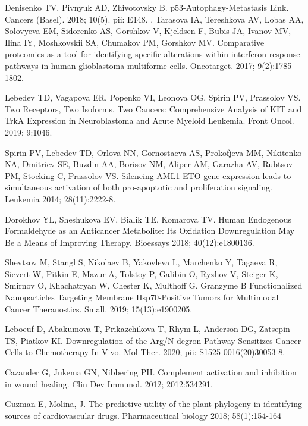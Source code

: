 \documentclass[12pt,aps]{revtex4}
\begin{document}
\begin{thebibliography}{00}


 Denisenko TV, Pivnyuk AD, Zhivotovsky B. p53-Autophagy-Metastasis Link. Cancers (Basel). 2018; 10(5). pii: E148. 
.
 Tarasova IA, Tereshkova AV, Lobas AA, Solovyeva EM, Sidorenko AS, Gorshkov V, Kjeldsen F, Bubis JA, Ivanov MV, Ilina IY, Moshkovskii SA, Chumakov PM, Gorshkov MV. Comparative proteomics as a tool for identifying specific alterations within interferon response pathways in human glioblastoma multiforme cells. Oncotarget. 2017; 9(2):1785-1802. 

 Lebedev TD, Vagapova ER, Popenko VI, Leonova OG, Spirin PV, Prassolov VS. Two Receptors, Two Isoforms, Two Cancers: Comprehensive Analysis of KIT and TrkA Expression in Neuroblastoma and Acute Myeloid Leukemia. Front Oncol. 2019; 9:1046. 

 Spirin PV, Lebedev TD, Orlova NN, Gornostaeva AS, Prokofjeva MM, Nikitenko NA, Dmitriev SE, Buzdin AA, Borisov NM, Aliper AM, Garazha AV, Rubtsov PM, Stocking C, Prassolov VS. Silencing AML1-ETO gene expression leads to simultaneous activation of both pro-apoptotic and proliferation signaling. Leukemia 2014; 28(11):2222-8. 

 Dorokhov YL, Sheshukova EV, Bialik TE, Komarova TV. Human Endogenous Formaldehyde as an Anticancer Metabolite: Its Oxidation Downregulation May Be a Means of Improving Therapy. Bioessays 2018; 40(12):e1800136.

 Shevtsov M, Stangl S, Nikolaev B, Yakovleva L, Marchenko Y, Tagaeva R, Sievert W, Pitkin E, Mazur A, Tolstoy P, Galibin O, Ryzhov V, Steiger K, Smirnov O, Khachatryan W, Chester K, Multhoff G. Granzyme B Functionalized Nanoparticles Targeting Membrane Hsp70-Positive Tumors for Multimodal Cancer Theranostics. Small. 2019; 15(13):e1900205.

 Leboeuf D, Abakumova T, Prikazchikova T, Rhym L, Anderson DG, Zatsepin TS, Piatkov KI. Downregulation of the Arg/N-degron Pathway Sensitizes Cancer Cells to Chemotherapy In Vivo. Mol Ther. 2020; pii: S1525-0016(20)30053-8. 

 Cazander G, Jukema GN, Nibbering PH. Complement activation and inhibition in wound healing. Clin Dev Immunol. 2012; 2012:534291. 

 Guzman E, Molina, J. The predictive utility of the plant phylogeny in identifying sources of cardiovascular drugs. Pharmaceutical biology 2018; 58(1):154-164


\end{thebibliography}
\end{document}
